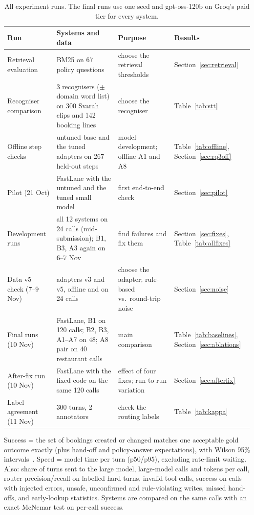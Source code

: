 \documentclass[11pt,a4paper]{article}
\makeatletter
\renewcommand\paragraph{\@startsection{paragraph}{4}{\z@}{1.2ex plus 0.5ex minus 0.2ex}{-1em}{\normalsize\bfseries}}
\makeatother
\begin{document}
\begin{table}[tbp]
\centering\small
\begin{tabularx}{\linewidth}{@{}>{\raggedright\arraybackslash}p{3.0cm}LL>{\raggedright\arraybackslash}p{2.1cm}@{}}
\toprule
Run & Systems and data & Purpose & Results \\
\midrule
Retrieval evaluation & BM25 on 67 policy questions & choose the retrieval thresholds & Section~\ref{sec:retrieval} \\
Recogniser comparison & 3 recognisers ($\pm$ domain word list) on 300 Svarah clips and 142 booking lines & choose the recogniser & Table~\ref{tab:stt} \\
Offline step checks & untuned base and the tuned adapters on 267 held-out steps & model development; offline A1 and A8 & Table~\ref{tab:offline}, Section~\ref{sec:rq3off} \\
Pilot (21 Oct) & FastLane with the untuned and the tuned small model & first end-to-end check & Section~\ref{sec:pilot} \\
Development runs & all 12 systems on 24 calls (mid-submission); B1, B3, A3 again on 6--7 Nov & find failures and fix them & Section~\ref{sec:fixes}, Table~\ref{tab:allfixes} \\
Data v5 check (7--9 Nov) & adapters v3 and v5, offline and on 24 calls & choose the adapter; rule-based vs.\ round-trip noise & Section~\ref{sec:noise} \\
Final runs (10 Nov) & FastLane, B1 on 120 calls; B2, B3, A1--A7 on 48; A8 pair on 40 restaurant calls & main comparison & Table~\ref{tab:baselines}, Section~\ref{sec:ablations} \\
After-fix run (10 Nov) & FastLane with the fixed code on the same 120 calls & effect of four fixes; run-to-run variation & Section~\ref{sec:afterfix} \\
Label agreement (11 Nov) & 300 turns, 2 annotators & check the routing labels & Table~\ref{tab:kappa} \\
\bottomrule
\end{tabularx}
\caption{All experiment runs. The final runs use one seed and gpt-oss-120b on Groq's paid tier for every system.}
\label{tab:allruns}
\end{table}

\paragraph{Metrics.} Success = the set of bookings created or changed matches one acceptable gold outcome exactly
(plus hand-off and policy-answer expectations), with Wilson 95\% intervals~\cite{wilson}. Speed = model time per turn (p50/p95),
excluding rate-limit waiting. Also: share of turns sent to the large model, large-model calls and tokens per call,
router precision/recall on labelled hard turns, invalid tool calls, success on calls with injected errors, unsafe,
unconfirmed and rule-violating writes, missed hand-offs, and early-lookup statistics. Systems are compared on the
same calls with an exact McNemar test on per-call success.
\end{document}
